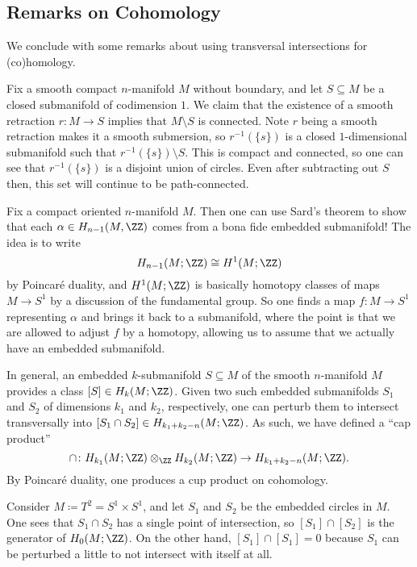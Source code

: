 \documentclass[../notes.tex]{subfiles}
\begin{document}
\subsection{Remarks on Cohomology}
We conclude with some remarks about using transversal intersections for (co)homology.
\begin{remark}
	Fix a smooth compact $n$-manifold $M$ without boundary, and let $S\subseteq M$ be a closed submanifold of codimension $1$. We claim that the existence of a smooth retraction $r\colon M\to S$ implies that $M\setminus S$ is connected. Note $r$ being a smooth retraction makes it a smooth submersion, so $r^{-1}(\{s\})$ is a closed $1$-dimensional submanifold such that $r^{-1}(\{s\})\setminus S$. This is compact and connected, so one can see that $r^{-1}(\{s\})$ is a disjoint union of circles. Even after subtracting out $S$ then, this set will continue to be path-connected.
\end{remark}
\begin{remark}
	Fix a compact oriented $n$-manifold $M$. Then one can use Sard's theorem to show that each $\alpha\in H_{n-1}(M,\ZZ)$ comes from a bona fide embedded submanifold! The idea is to write
	\[H_{n-1}(M;\ZZ)\cong H^1(M;\ZZ)\]
	by Poincar\'e duality, and $H^1(M;\ZZ)$ is basically homotopy classes of maps $M\to S^1$ by a discussion of the fundamental group. So one finds a map $f\colon M\to S^1$ representing $\alpha$ and brings it back to a submanifold, where the point is that we are allowed to adjust $f$ by a homotopy, allowing us to assume that we actually have an embedded submanifold.
\end{remark}
\begin{remark}
	In general, an embedded $k$-submanifold $S\subseteq M$ of the smooth $n$-manifold $M$ provides a class $[S]\in H_k(M;\ZZ)$. Given two such embedded submanifolds $S_1$ and $S_2$ of dimensions $k_1$ and $k_2$, respectively, one can perturb them to intersect transversally into $[S_1\cap S_2]\in H_{k_1+k_2-n}(M;\ZZ)$. As such, we have defined a ``cap product''
	\[\cap\colon H_{k_1}(M;\ZZ)\otimes_\ZZ H_{k_2}(M;\ZZ)\to H_{k_1+k_2-n}(M;\ZZ).\]
	By Poincar\'e duality, one produces a cup product on cohomology.
\end{remark}
\begin{example}
	Consider $M\coloneqq T^2=S^1\times S^1$, and let $S_1$ and $S_2$ be the embedded circles in $M$. One sees that $S_1\cap S_2$ has a single point of intersection, so $[S_1]\cap[S_2]$ is the generator of $H_0(M;\ZZ)$. On the other hand, $[S_1]\cap[S_1]=0$ because $S_1$ can be perturbed a little to not intersect with itself at all.
\end{example}
\end{document}
